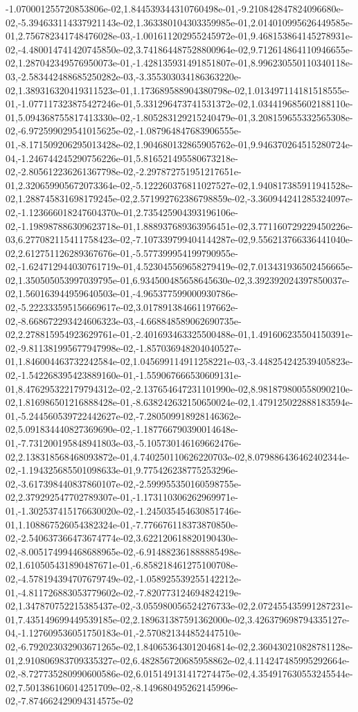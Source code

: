 -1.070001255720853806e-02,1.844539344310760498e-01,-9.210842847824096680e-02,-5.394633114337921143e-02,1.363380104303359985e-01,2.014010995626449585e-01,2.756782341748476028e-03,-1.001611202955245972e-01,9.468153864145278931e-02,-4.480014741420745850e-02,3.741864487528800964e-02,9.712614864110946655e-02,1.287042349576950073e-01,-1.428135931491851807e-01,8.996230550110340118e-03,-2.583442488685250282e-03,-3.355303034186363220e-02,1.389316320419311523e-01,1.173689588904380798e-02,1.013497114181518555e-01,-1.077117323875427246e-01,5.331296473741531372e-02,1.034419685602188110e-01,5.094368755817413330e-02,-1.805283129215240479e-01,3.208159655332565308e-02,-6.972599029541015625e-02,-1.087964847683906555e-01,-8.171509206295013428e-02,1.904680132865905762e-01,9.946370264515280724e-04,-1.246744245290756226e-01,5.816521495580673218e-02,-2.805612236261367798e-02,-2.297872751951217651e-01,2.320659905672073364e-02,-5.122260376811027527e-02,1.940817385911941528e-02,1.288745831698179245e-02,2.571992762386798859e-02,-3.360944241285324097e-02,-1.123666018247604370e-01,2.735425904393196106e-02,-1.198987886309623718e-01,1.888937689363956451e-02,3.771160729229450226e-03,6.277082115411758423e-02,-7.107339799404144287e-02,9.556213766336441040e-02,2.612751126289367676e-01,-5.577399954199790955e-02,-1.624712944030761719e-01,4.523045569658279419e-02,7.013431936502456665e-02,1.350505053997039795e-01,6.934500485658645630e-02,3.392392024397850037e-02,1.560163944959640503e-01,-4.965377599000930786e-02,-5.222333595156669617e-02,3.017891384661197662e-02,-8.668672293424606323e-03,-4.668848589062690735e-02,2.278815954923629761e-01,-2.401693463325500488e-01,1.491606235504150391e-02,-9.811381995677947998e-02,-1.857036948204040527e-01,1.846004463732242584e-02,1.045699114911258221e-03,-3.448254242539405823e-02,-1.542268395423889160e-01,-1.559067666530609131e-01,8.476295322179794312e-02,-2.137654647231101990e-02,8.981879800558090210e-02,1.816986501216888428e-01,-8.638242632150650024e-02,1.479125022888183594e-01,-5.244560539722442627e-02,-7.280509918928146362e-02,5.091834440827369690e-02,-1.187766790390014648e-01,-7.731200195848941803e-03,-5.105730146169662476e-02,2.138318568468093872e-01,4.740250110626220703e-02,8.079886436462402344e-02,-1.194325685501098633e-01,9.775426238775253296e-02,-3.617398440837860107e-02,-2.599955350160598755e-02,2.379292547702789307e-01,-1.173110306262969971e-01,-1.302537415176630020e-02,-1.245035454630851746e-01,1.108867526054382324e-01,-7.776676118373870850e-02,-2.540637366473674774e-02,3.622120618820190430e-02,-8.005174994468688965e-02,-6.914882361888885498e-02,1.610505431890487671e-01,-6.858218461275100708e-02,-4.578194394707679749e-02,-1.058925539255142212e-01,-4.811726883053779602e-02,-7.820773124694824219e-02,1.347870752215385437e-02,-3.055980056524276733e-02,2.072455435991287231e-01,7.435149699449539185e-02,2.189631387591362000e-02,3.426379698794335127e-04,-1.127609536051750183e-01,-2.570821344852447510e-02,-6.792023032903671265e-02,1.840653643012046814e-02,2.360430210828781128e-01,2.910806983709335327e-02,6.482856720685958862e-02,4.114247485995292664e-02,-8.727735280990600586e-02,6.015149131417274475e-02,4.354917630553245544e-02,7.501386106014251709e-02,-8.149680495262145996e-02,-7.874662429094314575e-02
